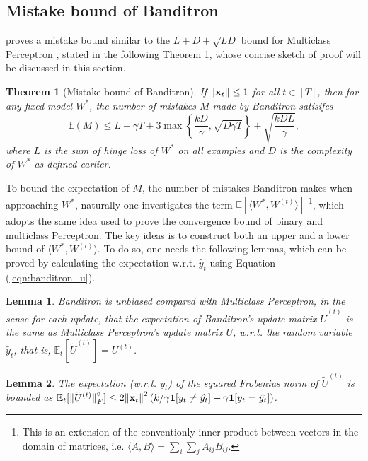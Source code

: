 \documentclass{article}
\newtheorem{lemma}{Lemma}
\newtheorem{theorem}{Theorem}
\begin{document}
\subsection{Mistake bound of Banditron}\label{sec:bound}
\citet{kakade2008efficient} proves a mistake bound similar to the $L+D+\sqrt{LD}$ bound for Multiclass Perceptron \cite{fink2006online}, stated in the following Theorem \ref{thm:bound}, whose concise sketch of proof will be discussed in this section.

\begin{theorem}[Mistake bound of Banditron]\label{thm:bound}
    If $\norm{\mathbf{x}_t}\leq1$ for all $t\in[T]$, then for any fixed model $W^*$, the number of mistakes $M$ made by Banditron satisifes \begin{equation}
        \mathbb{E}(M)\leq L+\gamma T+3\max\left\{\frac{kD}{\gamma},\sqrt{D\gamma T}\right\} + \sqrt{\frac{kDL}{\gamma}},
    \end{equation} where $L$ is the sum of hinge loss of $W^*$ on all examples and $D$ is the complexity of $W^*$ as defined earlier.
\end{theorem}

To bound the expectation of $M$, the number of mistakes Banditron makes when approaching $W^*$, naturally one investigates the term $\mathbb{E}[\langle W^*,W^{(t)}\rangle]$ \footnote{This is an extension of the conventionly inner product between vectors in the domain of matrices, i.e. $\langle A,B\rangle=\sum_i\sum_j A_{ij}B_{ij}$.}, which adopts the same idea used to prove the convergence bound of binary and multiclass Perceptron. The key ideas is to construct both an upper and a lower bound of $\langle W^*,W^{(t)}\rangle$. To do so, one needs the following lemmas, which can be proved by calculating the expectation w.r.t. $\tilde{y_t}$ using Equation (\ref{eqn:banditron_u}).

\begin{lemma}\label{lem:unbias}
    Banditron is unbiased compared with Multiclass Perceptron, in the sense for each update, that the expectation of Banditron's update matrix $\tilde{U}^{(t)}$ is the same as Multiclass Perceptron's update matrix $\tilde{U}$, w.r.t. the random variable $\tilde{y_t}$, that is, $\mathbb{E}_t[\tilde{U}^{(t)}]=U^{(t)}$.
\end{lemma}

\begin{lemma}\label{lem:frobenius}
    The expectation (w.r.t. $\tilde{y_t}$) of the squared Frobenius norm of $\tilde{U}^{(t)}$ is bounded as $\mathbb{E}_t[\Vert\tilde{U}^{(t)}\Vert^2_F]\leq2\norm{\mathbf{x}_t}^2\left(k/\gamma\mathbf{1}[y_t\neq \hat{y_t}]+\gamma\mathbf{1}[y_t=\hat{y_t}]\right)$.
\end{lemma}
\end{document}
